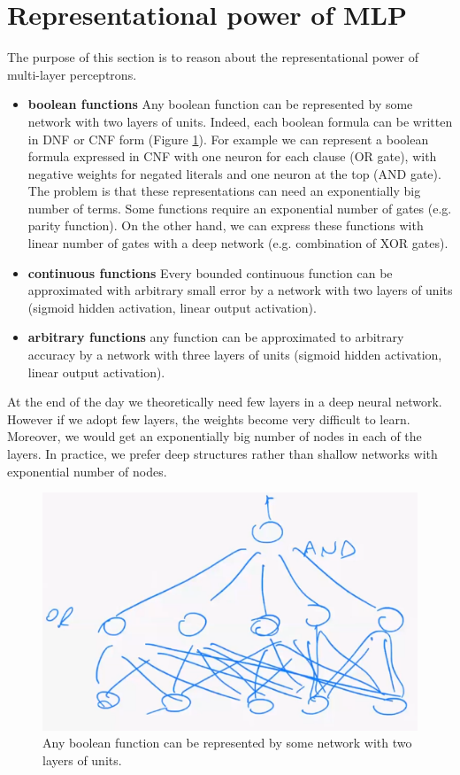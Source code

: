 \section{Representational power of MLP}
The purpose of this section is to reason about the representational power of multi-layer perceptrons.
\begin{itemize}
    \item \textbf{boolean functions} Any boolean function can be represented by some network with two layers of units. Indeed, each boolean formula can be written in DNF or CNF form (Figure \ref{fig:brutto_deep_boolean_fun}). For example we can represent a boolean formula expressed in CNF with one neuron for each clause (OR gate), with negative weights for negated literals and one neuron at the top (AND gate). The problem is that these representations can need an exponentially big number of terms. Some functions require an exponential number of gates (e.g. parity function). On the other hand, we can express these functions with linear number of gates with a deep network (e.g. combination of XOR gates).
    
    \item \textbf{continuous functions} Every bounded continuous function can be approximated with arbitrary small error by a network with two layers of units (sigmoid hidden activation, linear output activation).
    
    \item \textbf{arbitrary functions} any function can be approximated to arbitrary accuracy by a network with three layers of units (sigmoid hidden activation, linear output activation).
\end{itemize}

At the end of the day we theoretically need few layers in a deep neural network. However if we adopt few layers, the weights become very difficult to learn. Moreover, we would get an exponentially big number of nodes in each of the layers. In practice, we prefer deep structures rather than shallow networks with exponential number of nodes.

\begin{figure}
    \centering
    \includegraphics[scale=0.5]{images/brutto_deep_boolean_fun.png}
    \caption{Any boolean function can be represented by some network with two layers of units.}
    \label{fig:brutto_deep_boolean_fun}
\end{figure}

